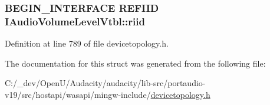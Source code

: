 \subsubsection[{\texorpdfstring{riid}{riid}}]{\setlength{\rightskip}{0pt plus 5cm}B\+E\+G\+I\+N\+\_\+\+I\+N\+T\+E\+R\+F\+A\+CE {\bf R\+E\+F\+I\+ID} I\+Audio\+Volume\+Level\+Vtbl\+::riid}\hypertarget{struct_i_audio_volume_level_vtbl_a68f93ea7f3ea3c62bb16ef243a32b923}{}\label{struct_i_audio_volume_level_vtbl_a68f93ea7f3ea3c62bb16ef243a32b923}


Definition at line 789 of file devicetopology.\+h.



The documentation for this struct was generated from the following file\+:\begin{DoxyCompactItemize}
\item 
C\+:/\+\_\+dev/\+Open\+U/\+Audacity/audacity/lib-\/src/portaudio-\/v19/src/hostapi/wasapi/mingw-\/include/\hyperlink{devicetopology_8h}{devicetopology.\+h}\end{DoxyCompactItemize}
